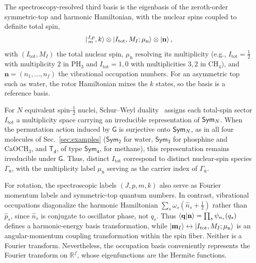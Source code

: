 \documentclass[
  reprint,
  aps,
  prx,
  superscriptaddress,
  amsmath,
  amssymb,
  longbibliography
]{revtex4-2}
\newcommand{\grp}[1]{\mathsf{#1}}
\newcommand{\Sym}[1]{\grp{Sym_{#1}}}
\newcommand{\parity}{p}               %
\providecommand{\Gspin}{\Gamma_{\mathrm{n}}}
\begin{document}
The spectroscopy-resolved third basis is the eigenbasis of the zeroth-order symmetric-top and harmonic Hamiltonian, with the nuclear spins coupled to definite total spin,
\begin{equation}
\ket{{}^{J,\parity}_{\,m},k}\otimes\ket{I_{\mathrm{tot}},M_{I};\mu_{\mathrm n}}\otimes\ket{\mathbf n},
\label{eq:spectroscopic_basis}
\end{equation}
with $(I_{\mathrm{tot}},M_I)$ the total nuclear spin, $\mu_{\mathrm n}$ resolving its multiplicity (e.g., $I_{\mathrm{tot}}=\tfrac12$ with multiplicity $2$ in $\mathrm{PH_3}$ and $I_{\mathrm{tot}}=1,0$ with multiplicities $3,2$ in $\mathrm{CH_4}$), and $\mathbf n=(n_1,\ldots,n_f)$ the vibrational occupation numbers. For an asymmetric top such as water, the rotor Hamiltonian mixes the $k$ states, so the basis is a reference basis.

For $N$ equivalent spin-$\tfrac12$ nuclei, Schur--Weyl duality~\cite{Schmiedt2016, KubischtaTeixeira2026} assigns each total-spin sector $I_{\mathrm{tot}}$ a multiplicity space carrying an irreducible representation of $\Sym{\mathnormal{N}}$. When the permutation action induced by $\grp{G}$ is surjective onto $\Sym{\mathnormal{N}}$, as in all four molecules of Sec.~\ref{sec:examples} ($\Sym{2}$ for water, $\Sym{3}$ for phosphine and $\mathrm{CaOCH_3}$, and $\grp{T_{d}}$, of type $\Sym{4}$, for methane), this representation remains irreducible under $\grp{G}$. Thus, distinct $I_{\mathrm{tot}}$ correspond to distinct nuclear-spin species $\Gspin$, with the multiplicity label $\mu_{\mathrm n}$ serving as the carrier index of $\Gspin$.

For rotation, the spectroscopic labels $(J,\parity,m,k)$ also serve as Fourier momentum labels and symmetric-top quantum numbers. In contrast, vibrational occupations diagonalize the harmonic Hamiltonian $\sum_s\omega_s(\hat n_s+\tfrac12)$ rather than $\hat p_s$, since $\hat n_s$ is conjugate to oscillator phase, not $q_s$. Thus
\(
\braket{\mathbf q|\mathbf n}
=\prod_s\psi_{n_s}(q_s)
\)
defines a harmonic-energy basis transformation, while $\ket{\mathbf m_I}\leftrightarrow \ket{I_{\mathrm{tot}},M_I;\mu_{\mathrm n}}$ is an angular-momentum coupling transformation within the spin fiber. Neither is a Fourier transform. Nevertheless, the occupation basis conveniently represents the Fourier transform on $\mathbb R^f$, whose eigenfunctions are the Hermite functions.
\end{document}
